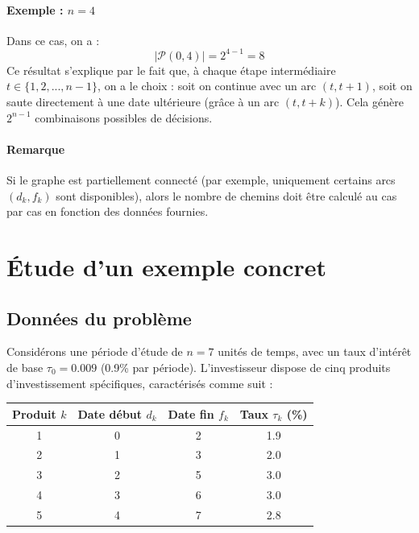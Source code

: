 \documentclass[a4paper,11pt]{article}
\begin{document}
\paragraph{Exemple : $n = 4$} 
Dans ce cas, on a :
\[
	|\mathcal{P}(0, 4)| = 2^{4-1} = 8
\]
Ce résultat s’explique par le fait que, à chaque étape intermédiaire $t \in \{1, 2, ..., n-1\}$, on a le choix : soit on continue avec un arc $(t, t+1)$, soit on saute directement à une date ultérieure (grâce à un arc $(t, t+k)$). Cela génère $2^{n-1}$ combinaisons possibles de décisions.

\paragraph{Remarque} 
Si le graphe est partiellement connecté (par exemple, uniquement certains arcs $(d_k, f_k)$ sont disponibles), alors le nombre de chemins doit être calculé au cas par cas en fonction des données fournies.


\section{Étude d’un exemple concret}

\subsection{Données du problème}

Considérons une période d’étude de $n = 7$ unités de temps, avec un taux d’intérêt de base $\tau_0 = 0.009$ (0.9\% par période). L’investisseur dispose de cinq produits d’investissement spécifiques, caractérisés comme suit :

\begin{center}
	\begin{tabular}{|c|c|c|c|}
		\hline
		Produit $k$ & Date début $d_k$ & Date fin $f_k$ & Taux $\tau_k$ (\%) \\
		\hline
		1           & 0                 & 2              & 1.9                \\
		2           & 1                 & 3              & 2.0                \\
		3           & 2                 & 5              & 3.0                \\
		4           & 3                 & 6              & 3.0                \\
		5           & 4                 & 7              & 2.8                \\
		\hline
	\end{tabular}
\end{center}
\end{document}
